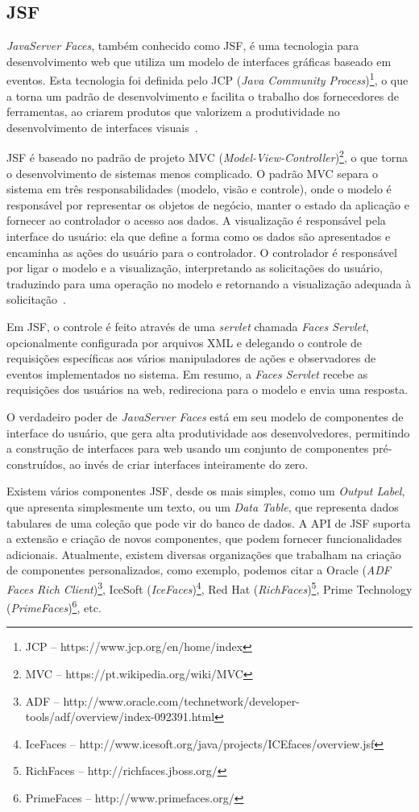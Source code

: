 \subsection{JSF}

\textit{JavaServer Faces}, também conhecido como JSF, é uma tecnologia para desenvolvimento web que utiliza um modelo de interfaces gráficas baseado em eventos. Esta tecnologia foi definida pelo JCP (\textit{Java Community Process})\footnote{JCP -- https://www.jcp.org/en/home/index}, o que a torna um padrão de desenvolvimento e facilita o trabalho dos fornecedores de ferramentas, ao criarem produtos que valorizem a produtividade no desenvolvimento de interfaces visuais~\cite{thiagoJava}.

JSF é baseado no padrão de projeto MVC (\textit{Model-View-Controller})\footnote{MVC -- https://pt.wikipedia.org/wiki/MVC}, o que torna o desenvolvimento de sistemas menos complicado. O padrão MVC separa o sistema em três responsabilidades (modelo, visão e controle), onde o modelo é responsável por representar os objetos de negócio, manter o estado da aplicação e fornecer ao controlador o acesso aos dados. A visualização é responsável pela interface do usuário: ela que define a forma como os dados são apresentados e encaminha as ações do usuário para o controlador. O controlador é responsável por ligar o modelo e a visualização, interpretando as solicitações do usuário, traduzindo para uma operação no modelo e retornando a visualização adequada à solicitação~\cite{thiagoJava}.

Em JSF, o controle é feito através de uma \textit{servlet} chamada \textit{Faces Servlet}, opcionalmente configurada por arquivos XML e delegando o controle de requisições específicas aos vários manipuladores de ações e observadores de eventos implementados no sistema. Em resumo, a \textit{Faces Servlet} recebe as requisições dos usuários na web, redireciona para o modelo e envia uma resposta.

O verdadeiro poder de \textit{JavaServer Faces} está em seu modelo de componentes de interface do usuário, que gera alta produtividade aos desenvolvedores, permitindo a construção de interfaces para web usando um conjunto de componentes pré-construídos, ao invés de criar interfaces inteiramente do zero.

Existem vários componentes JSF, desde os mais simples, como um \emph{Output Label}, que apresenta simplesmente um texto, ou um \emph{Data Table}, que representa dados tabulares de uma coleção que pode vir do banco de dados. A API de JSF suporta a extensão e criação de novos componentes, que podem fornecer funcionalidades adicionais. Atualmente, existem diversas organizações que trabalham na criação de componentes personalizados, como exemplo, podemos citar a Oracle (\textit{ADF Faces Rich Client})\footnote{ADF -- http://www.oracle.com/technetwork/developer-tools/adf/overview/index-092391.html}, IceSoft (\textit{IceFaces})\footnote{IceFaces -- http://www.icesoft.org/java/projects/ICEfaces/overview.jsf}, Red Hat (\textit{RichFaces})\footnote{RichFaces -- http://richfaces.jboss.org/}, Prime Technology (\textit{PrimeFaces})\footnote{PrimeFaces -- http://www.primefaces.org/}, etc.

